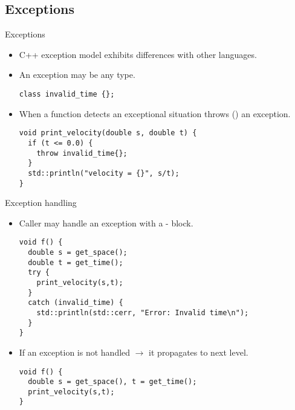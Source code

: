\subsection{Exceptions}

\begin{frame}[t,fragile]{Exceptions}
\begin{itemize}
  \item C++ exception model exhibits differences with other languages.

  \pause\vfill
  \item An exception may be any type.
\begin{lstlisting}
class invalid_time {};
\end{lstlisting}

  \pause\vfill
  \item When a function detects an exceptional situation throws
        () an exception.
\begin{lstlisting}
void print_velocity(double s, double t) {
  if (t <= 0.0) {
    throw invalid_time{};
  }
  std::println("velocity = {}", s/t);
}
\end{lstlisting}

\end{itemize}
\end{frame}

\begin{frame}[t,fragile]{Exception handling}
\begin{itemize}
  \item Caller may handle an exception with a - block.
\begin{lstlisting}
void f() {
  double s = get_space();
  double t = get_time();
  try {
    print_velocity(s,t);
  }
  catch (invalid_time) {
    std::println(std::cerr, "Error: Invalid time\n");
  }
}
\end{lstlisting}
  \vfill\pause
  \item If an exception is not handled $\rightarrow$ it propagates to next level.
\begin{lstlisting}
void f() {
  double s = get_space(), t = get_time();
  print_velocity(s,t);
}
\end{lstlisting}
\end{itemize}
\end{frame}

